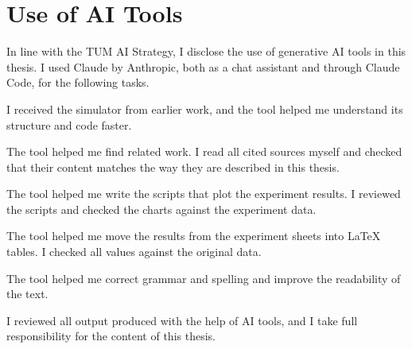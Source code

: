 
\chapter{Use of AI Tools}\label{chapter:appendix-ai}

In line with the TUM AI Strategy, I disclose the use of generative AI tools in
this thesis. I used Claude by Anthropic, both as a chat assistant and through
Claude Code, for the following tasks.

\begin{bullets}
  \item[Learning the codebase.] I received the simulator from earlier work, and
    the tool helped me understand its structure and code faster.
  \item[Literature search.] The tool helped me find related work. I read all
    cited sources myself and checked that their content matches the way they
    are described in this thesis.
  \item[Chart scripts.] The tool helped me write the scripts that plot the
    experiment results. I reviewed the scripts and checked the charts against
    the experiment data.
  \item[LaTeX tables.] The tool helped me move the results from the experiment
    sheets into LaTeX tables. I checked all values against the original data.
  \item[Proofreading.] The tool helped me correct grammar and spelling and
    improve the readability of the text.
\end{bullets}

\noindent
I reviewed all output produced with the help of AI tools, and I take full
responsibility for the content of this thesis.
